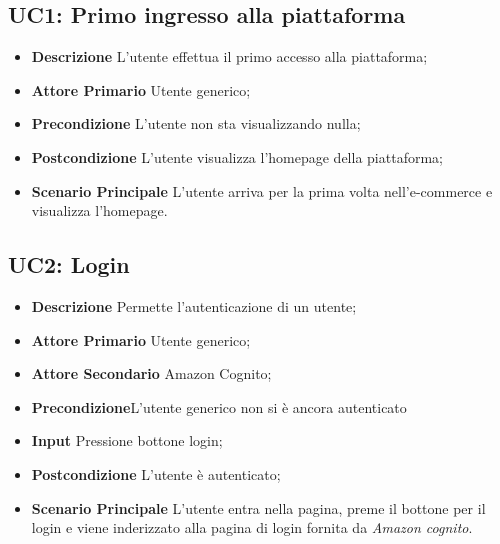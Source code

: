         \subsection{UC1: Primo ingresso alla piattaforma}
        \label{sec:UC1}
        \begin{itemize}
            \item \textbf{Descrizione} L'utente effettua il primo accesso alla piattaforma;
            \item \textbf{Attore Primario} Utente generico;
            \item \textbf{Precondizione} L'utente non sta visualizzando nulla;
            \item \textbf{Postcondizione} L'utente visualizza l'homepage della piattaforma;
            \item \textbf{Scenario Principale} L'utente arriva per la prima volta nell'e-commerce e visualizza l'homepage.
        \end{itemize}
        \subsection{UC2: Login}
        \label{sec:UC2}
        \begin{itemize}
            \item \textbf{Descrizione} Permette l'autenticazione di un utente;
            \item \textbf{Attore Primario} Utente generico;
            \item \textbf{Attore Secondario} Amazon Cognito;
            \item \textbf{Precondizione}L'utente generico non si è ancora autenticato
            \item \textbf{Input} Pressione bottone login;
            \item \textbf{Postcondizione} L'utente è autenticato;
            \item \textbf{Scenario Principale} L'utente entra nella pagina, preme il bottone per il login e viene inderizzato alla pagina di login fornita da \textit{Amazon cognito}.
        \end{itemize}
